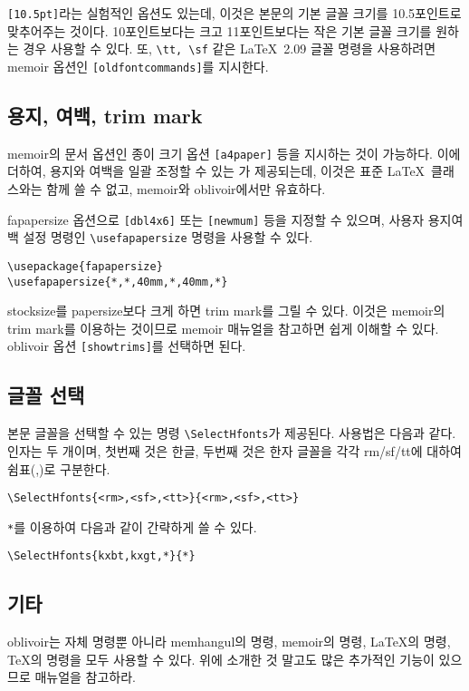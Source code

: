 \verb|[10.5pt]|라는 실험적인 옵션도 있는데, 이것은 본문의 기본 글꼴
크기를 10.5포인트로 맞추어주는 것이다. 10포인트보다는 크고 11포인트보다는
작은 기본 글꼴 크기를 원하는 경우 사용할 수 있다. 또, \verb|\tt, \sf| 같은
\LaTeX\ 2.09 글꼴 명령을 사용하려면 memoir 옵션인 \verb|[oldfontcommands]|를 지시한다.

\subsection{용지, 여백, trim mark}

memoir의 문서 옵션인 종이 크기 옵션 \verb|[a4paper]| 등을 지시하는
것이 가능하다. 이에 더하여, 용지와 여백을 일괄 조정할 수 있는
가 제공되는데, 이것은 표준 \LaTeX\ 클래스와는
함께 쓸 수 없고, memoir와 oblivoir에서만 유효하다.

fapapersize 옵션으로 \verb|[dbl4x6]| 또는 \verb|[newmum]| 등을
지정할 수 있으며, 사용자 용지여백 설정 명령인 \verb|\usefapapersize| 명령을
사용할 수 있다.
\begin{verbatim}
\usepackage{fapapersize}
\usefapapersize{*,*,40mm,*,40mm,*}
\end{verbatim}

stocksize를 papersize보다 크게 하면 trim mark를 그릴 수 있다. 이것은
memoir의 trim mark를 이용하는 것이므로 memoir 매뉴얼을 참고하면
쉽게 이해할 수 있다. oblivoir
옵션 \verb|[showtrims]|를 선택하면 된다.

\subsection{글꼴 선택}

본문 글꼴을 선택할 수 있는 명령 \verb|\SelectHfonts|가 제공된다.
사용법은 다음과 같다. 인자는 두 개이며, 첫번째 것은 한글, 두번째
것은 한자 글꼴을 각각 rm/sf/tt에 대하여 쉼표(,)로 구분한다.
\begin{verbatim}
\SelectHfonts{<rm>,<sf>,<tt>}{<rm>,<sf>,<tt>}
\end{verbatim}
\verb|*|를 이용하여 다음과 같이 간략하게 쓸 수 있다.
\begin{verbatim}
\SelectHfonts{kxbt,kxgt,*}{*}
\end{verbatim}

\subsection{기타}

oblivoir는 자체 명령뿐 아니라 memhangul의 명령, memoir의 명령,
\LaTeX 의 명령, \TeX 의 명령을 모두 사용할 수 있다. 위에 소개한 것 말고도
많은 추가적인 기능이 있으므로 매뉴얼을 참고하라.

\endinput
